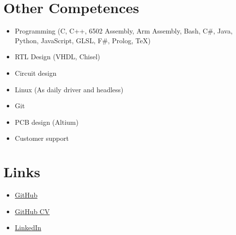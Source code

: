 \section{Other Competences}
	\begin{itemize}
		\item Programming (C, C++, 6502 Assembly, Arm Assembly, Bash, C\#, Java, Python, JavaScript, GLSL, F\#, Prolog, TeX)
		\item RTL Design (VHDL, Chisel)
		\item Circuit design
		\item Linux (As daily driver and headless)
		\item Git
		\item PCB design (Altium)
		\item Customer support
	\end{itemize}
	
\section{Links}
	\begin{itemize}
		\item \href{https://github.com/jondalnas}{GitHub}
		\item \href{https://github.com/jondalnas/CV}{GitHub CV}
		\item \href{https://www.linkedin.com/in/jonas-jensen-68a1091b1/}{LinkedIn}
	\end{itemize}

